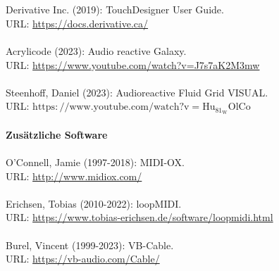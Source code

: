 \documentclass[12pt]{scrartcl}%
\theoremstyle{nonumberplain}
\begin{document}
\\\\
Derivative Inc. (2019): TouchDesigner User Guide.\\
URL: \href{https://docs.derivative.ca/}{https://docs.derivative.ca/}
\\\\
Acrylicode (2023): Audio reactive Galaxy.\\
URL: \href{https://www.youtube.com/watch?v=J7s7aK2M3mw}{https://www.youtube.com/watch?v=J7s7aK2M3mw}
\\\\
Steenhoff, Daniel (2023): Audioreactive Fluid Grid VISUAL.\\
URL: \href{https://www.youtube.com/watch?v=Hu_81_WOlCo}{$\mathrm{https://www.youtube.com/watch?v=Hu_81_WOlCo}$}
\\\\
\textbf{Zusätzliche Software}
\\\\
O'Connell, Jamie (1997-2018): MIDI-OX.\\
URL: \href{http://www.midiox.com/}{http://www.midiox.com/}
\\\\
Erichsen, Tobias (2010-2022): loopMIDI.\\
URL: \href{https://www.tobias-erichsen.de/software/loopmidi.html}{https://www.tobias-erichsen.de/software/loopmidi.html}
\\\\
Burel, Vincent (1999-2023): VB-Cable.\\
URL: \href{https://vb-audio.com/Cable/}{https://vb-audio.com/Cable/}
\end{document}
